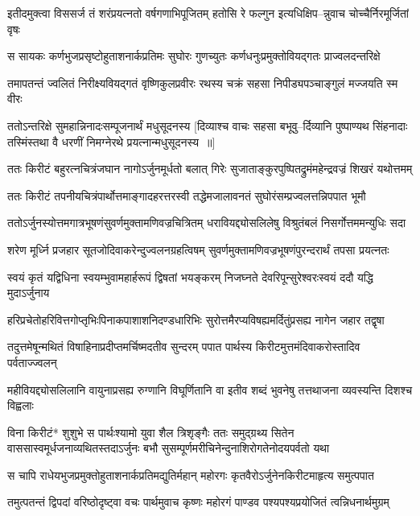 \twolineshloka
{इतीदमुक्त्वा विससर्ज तं शरंप्रयत्नतो वर्षगणाभिपूजितम्}
{हतोसि रे फल्गुन इत्यधिक्षिप--न्नुवाच चोच्चैर्निरमूर्जितां वृषः}


\twolineshloka
{स सायकः कर्णभुजप्रसृष्टोहुताशनार्कप्रतिमः सुघोरः}
{गुणच्युतः कर्णधनुःप्रमुक्तोवियद्गतः प्राज्वलदन्तरिक्षे}


\twolineshloka
{तमापतन्तं ज्वलितं निरीक्ष्यवियद्गतं वृष्णिकुलप्रवीरः}
{रथस्य चक्रं सहसा निपीड्यपञ्चाङ्गुलं मज्जयति स्म वीरः}


\threelineshloka
{ततोऽन्तरिक्षे सुमहान्निनादःसम्पूजनार्थं मधुसूदनस्य}
{[दिव्याश्च वाचः सहसा बभूवु--र्दिव्यानि पुष्पाण्यथ सिंहनादाः}
{तस्मिंस्तथा वै धरणीं निमग्नेरथे प्रयत्नान्मधुसूदनस्य ॥]}


\twolineshloka
{ततः किरीटं बहुरत्नचित्रंजघान नागोऽर्जुनमूर्धतो बलात्}
{गिरेः सुजाताङ्कुरपुष्पितद्रुमंमहेन्द्रवज्रं शिखरं यथोत्तमम्}


\twolineshloka
{ततः किरीटं तपनीयचित्रंपार्थोत्तमाङ्गादहरत्तरस्वी}
{तद्धेमजालावनतं सुघोरंसम्प्रज्वलत्तन्निपपात भूमौ}


\twolineshloka
{ततोऽर्जुनस्योत्तमगात्रभूषणंसुवर्णमुक्तामणिवज्रचित्रितम्}
{धरावियद्द्योसलिलेषु विश्रुतंबलं निसर्गोत्तममन्युधिः सदा}


\twolineshloka
{शरेण मूर्ध्नि प्रजहार सूतजोदिवाकरेन्दुज्वलनग्रहत्विषम्}
{सुवर्णमुक्तामणिवज्रभूषणंपुरन्दरार्थं तपसा प्रयत्नतः}


\twolineshloka
{स्वयं कृतं यद्विधिना स्वयम्भुवामहार्हरूपं द्विषतां भयङ्करम्}
{निजघ्नते देवरिपून्सुरेश्वरःस्वयं ददौ यद्धि मुदाऽर्जुनाय}


\twolineshloka
{हरिप्रचेतोहरिवित्तगोप्तृभिःपिनाकपाशाशनिदण्डधारिभिः}
{सुरोत्तमैरप्यविषह्यमर्दितुंप्रसह्य नागेन जहार तद्वृषा}


\twolineshloka
{तदुत्तमेषून्मथितं विषाहिनाप्रदीप्तमर्चिष्मदतीव सुन्दरम्}
{पपात पार्थस्य किरीटमुत्तमंदिवाकरोस्तादिव पर्वताज्ज्वलन्}


\twolineshloka
{महीवियद्द्योसलिलानि वायुनाप्रसह्य रुग्णानि विघूर्णितानि वा}
{इतीव शब्दं भुवनेषु तत्तथाजना व्यवस्यन्ति दिशश्च विह्वलाः}


विना किरीटं* शुशुभे स पार्थःश्यामो युवा शैल त्रिशृङ्गैः
\twolineshloka
{ततः समुद्ग्रथ्य सितेन वाससास्वमूर्धजनाव्यथितस्तदाऽर्जुनः}
{बभौ सुसम्पूर्णमरीचिनेन्दुनाशिरोगतेनोदयपर्वतो यथा}


\twolineshloka
{स चापि राधेयभुजप्रमुक्तोहुताशनार्कप्रतिमद्युतिर्महान्}
{महोरगः कृतवैरोऽर्जुनेनकिरीटमाहृत्य समुत्पपात}


\twolineshloka
{तमुत्पतन्तं द्विपदां वरिष्ठोदृष्ट्वा वचः पार्थमुवाच कृष्णः}
{महोरगं पाण्डव पश्यपश्यप्रयोजितं त्वन्निधनार्थमुग्रम्}



